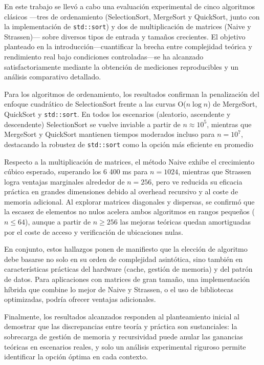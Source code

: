En este trabajo se llevó a cabo una evaluación experimental de cinco algoritmos clásicos —tres de ordenamiento (SelectionSort, MergeSort y QuickSort, junto con la implementación de \texttt{std::sort}) y dos de multiplicación de matrices (Naive y Strassen)— sobre diversos tipos de entrada y tamaños crecientes. El objetivo planteado en la introducción—cuantificar la brecha entre complejidad teórica y rendimiento real bajo condiciones controladas—se ha alcanzado satisfactoriamente mediante la obtención de mediciones reproducibles y un análisis comparativo detallado.

Para los algoritmos de ordenamiento, los resultados confirman la penalización del enfoque cuadrático de SelectionSort frente a las curvas O(\(n\log n\)) de MergeSort, QuickSort y \texttt{std::sort}. En todos los escenarios (aleatorio, ascendente y descendente) SelectionSort se vuelve inviable a partir de \(n\approx10^5\), mientras que MergeSort y QuickSort mantienen tiempos moderados incluso para \(n=10^7\), destacando la robustez de \texttt{std::sort} como la opción más eficiente en promedio

Respecto a la multiplicación de matrices, el método Naive exhibe el crecimiento cúbico esperado, superando los 6 400 ms para \(n=1024\), mientras que Strassen logra ventajas marginales alrededor de \(n=256\), pero ve reducida su eficacia práctica en grandes dimensiones debido al overhead recursivo y al coste de memoria adicional. Al explorar matrices diagonales y dispersas, se confirmó que la escasez de elementos no nulos acelera ambos algoritmos en rangos pequeños (\(n\le64\)), aunque a partir de \(n\ge256\) las mejoras teóricas quedan amortiguadas por el coste de acceso y verificación de ubicaciones nulas.

En conjunto, estos hallazgos ponen de manifiesto que la elección de algoritmo debe basarse no solo en su orden de complejidad asintótica, sino también en características prácticas del hardware (cache, gestión de memoria) y del patrón de datos. Para aplicaciones con matrices de gran tamaño, una implementación híbrida que combine lo mejor de Naive y Strassen, o el uso de bibliotecas optimizadas, podría ofrecer ventajas adicionales.

Finalmente, los resultados alcanzados responden al planteamiento inicial al demostrar que las discrepancias entre teoría y práctica son sustanciales: la sobrecarga de gestión de memoria y recursividad puede anular las ganancias teóricas en escenarios reales, y solo un análisis experimental riguroso permite identificar la opción óptima en cada contexto.
